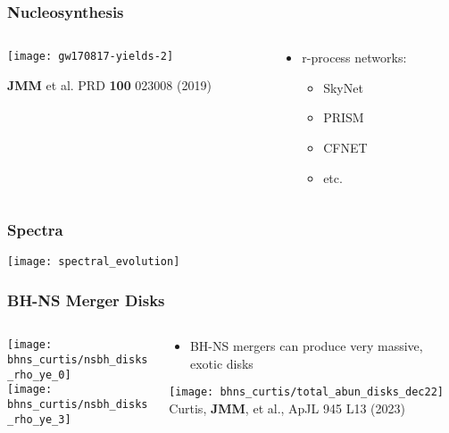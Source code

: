 \documentclass[]{beamer}
\begin{document}
\begin{frame}
  \frametitle{Nucleosynthesis}
  \begin{columns}
    \begin{column}{9cm}
      \begin{center}
        \texttt{[image: gw170817-yields-2]}
      \end{center}
      \begin{tiny}
        \textbf{JMM} et al. PRD \textbf{100} 023008 (2019)
      \end{tiny}
    \end{column}
    \begin{column}{3cm}
      \begin{itemize}
      \item r-process networks:
        \begin{itemize}
        \item SkyNet
        \item PRISM
        \item CFNET
        \item etc.
        \end{itemize}
      \end{itemize}
    \end{column}
  \end{columns}
\end{frame}

\begin{frame}
  \frametitle{Spectra}
  \begin{center}
    \texttt{[image: spectral\_evolution]}
  \end{center}
\end{frame}

\begin{frame}
  \frametitle{BH-NS Merger Disks}
  \begin{columns}
    \begin{column}{6cm}
      \begin{center}
        \texttt{[image: bhns\_curtis/nsbh\_disks\_rho\_ye\_0]}\\
        \texttt{[image: bhns\_curtis/nsbh\_disks\_rho\_ye\_3]}
      \end{center}
    \end{column}
    \begin{column}{6cm}
      \begin{itemize}
      \item BH-NS mergers can produce very massive, exotic disks
      \end{itemize}
      \begin{center}
        \texttt{[image: bhns\_curtis/total\_abun\_disks\_dec22]}
        {\footnotesize Curtis, \textbf{JMM}, et al., ApJL 945 L13 (2023)}
      \end{center}
    \end{column}
  \end{columns}
\end{frame}
\end{document}
